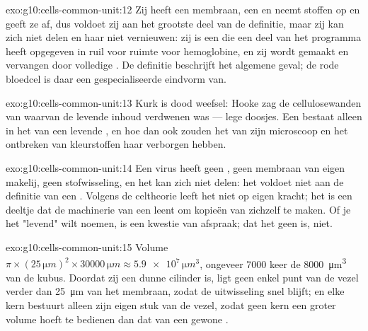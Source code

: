 \begin{solution}{exo:g10:cells-common-unit:12}
Zij heeft een membraan, een  en neemt stoffen op en geeft ze
af, dus voldoet zij aan het grootste deel van de definitie, maar zij kan
zich niet delen en haar  niet vernieuwen: zij is een  die een
deel van het programma heeft opgegeven in ruil voor ruimte voor
hemoglobine, en zij wordt gemaakt en vervangen door volledige . De
definitie beschrijft het algemene geval; de rode bloedcel is daar een
gespecialiseerde eindvorm van.
\end{solution}

\begin{solution}{exo:g10:cells-common-unit:13}
Kurk is dood weefsel: Hooke zag de cellulosewanden van  waarvan de
levende inhoud verdwenen was --- lege doosjes. Een  bestaat
alleen in het  van een levende , en hoe dan ook zouden het
 van zijn microscoop en het ontbreken van kleurstoffen
haar verborgen hebben.
\end{solution}

\begin{solution}{exo:g10:cells-common-unit:14}
Een virus heeft geen , geen membraan van eigen makelij, geen
stofwisseling, en het kan zich niet delen: het voldoet niet aan de
definitie van een . Volgens de celtheorie leeft het niet op eigen
kracht; het is een deeltje dat de machinerie van een  leent om
kopieën van zichzelf te maken. Of je het "levend" wilt noemen, is een
kwestie van afspraak; dat het geen  is, niet.
\end{solution}

\begin{solution}{exo:g10:cells-common-unit:15}
Volume $\pi \times (25\,\unit{\micro m})^2 \times 30000\,\unit{\micro m}
\approx \num{5.9e7}\,\unit{\micro m^3}$, ongeveer 7000 keer de
\qty{8000}{\micro m^3} van de kubus. Doordat zij een dunne cilinder is,
ligt geen enkel punt van de vezel verder dan \qty{25}{\micro m} van het
membraan, zodat de uitwisseling snel blijft; en elke kern bestuurt
alleen zijn eigen stuk van de vezel, zodat geen kern een groter volume
hoeft te bedienen dan dat van een gewone .
\end{solution}

